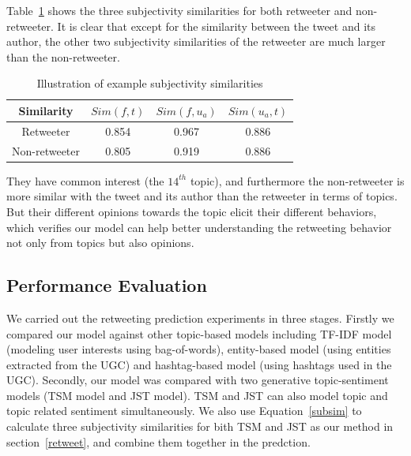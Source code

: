 \documentclass[letterpaper]{article}
\begin{document}
Table~\ref{tab4} shows the three subjectivity similarities for both retweeter and non-retweeter. It is clear that except for the similarity between the tweet and its author, the other two subjectivity similarities of the retweeter are much larger than the non-retweeter.
\begin{table}[h]
\scriptsize
\centering
\caption{ Illustration of example subjectivity similarities}
\label{tab4}
\begin{tabular}{|c|c|c|c|}
\hline
Similarity & $ Sim(f,t) $ & $ Sim(f,u_a)  $ & $ Sim(u_a,t)  $\\
\hline
Retweeter & 0.854 & 0.967 & 0.886\\
\hline
Non-retweeter & 0.805 & 0.919 & 0.886\\
\hline
\end{tabular}
\end{table} 
They have common interest (the $ 14^{th} $ topic), and furthermore the non-retweeter is more similar with the tweet and its author than the retweeter in terms of topics. But their different opinions towards the topic elicit their different behaviors, which verifies our model can help better understanding the retweeting behavior not only from topics but also opinions.

\subsection{Performance Evaluation}

We carried out the retweeting prediction experiments in three stages. Firstly we compared our model against other topic-based models including TF-IDF model (modeling user interests using bag-of-words), entity-based model (using entities extracted from the UGC) and hashtag-based model (using hashtags used in the UGC)\cite{abel2011analyzing}.
Secondly, our model was compared with two generative topic-sentiment models (TSM model\cite{mei2007topic} and JST model\cite{lin2009joint}). TSM and JST can also model topic and topic related sentiment simultaneously. We also use Equation~\ref{subsim} to calculate three  subjectivity similarities for bith TSM and JST as our method in section~\ref{retweet}, and combine them together in the predction.
\end{document}
